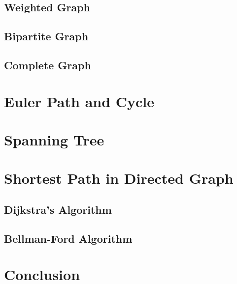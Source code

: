 \documentclass{article}
\begin{document}
\subsection{Weighted Graph}
\label{weighted_graph}

\subsection{Bipartite Graph}
\label{bipartite_graph}

\subsection{Complete Graph}
\label{complete_graph}

\section{Euler Path and Cycle}
\label{euler_path_and_cycle}

\section{Spanning Tree}
\label{spaning_tree}

\section{Shortest Path in Directed Graph}
\label{shortest_path_in_directed_graph}

\subsection{Dijkstra's Algorithm}
\label{dijkstra_algorithm}

\subsection{Bellman-Ford Algorithm}
\label{bellman_ford_algorithm}

\section{Conclusion}
\label{conclusion}
\end{document}
